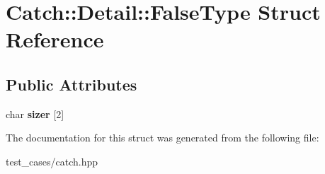 \hypertarget{structCatch_1_1Detail_1_1FalseType}{}\section{Catch\+:\+:Detail\+:\+:False\+Type Struct Reference}
\label{structCatch_1_1Detail_1_1FalseType}
\subsection*{Public Attributes}
\begin{DoxyCompactItemize}
\item 
\mbox{\label{structCatch_1_1Detail_1_1FalseType_abc1a730e197d6f7750ae8aaf47b63477}} 
char {\bfseries sizer} \mbox{[}2\mbox{]}
\end{DoxyCompactItemize}


The documentation for this struct was generated from the following file\+:\begin{DoxyCompactItemize}
\item 
test\+\_\+cases/catch.\+hpp\end{DoxyCompactItemize}
